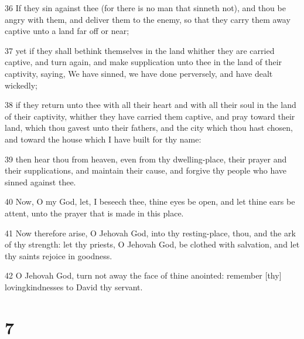 \par 36 If they sin against thee (for there is no man that sinneth not), and thou be angry with them, and deliver them to the enemy, so that they carry them away captive unto a land far off or near;
\par 37 yet if they shall bethink themselves in the land whither they are carried captive, and turn again, and make supplication unto thee in the land of their captivity, saying, We have sinned, we have done perversely, and have dealt wickedly;
\par 38 if they return unto thee with all their heart and with all their soul in the land of their captivity, whither they have carried them captive, and pray toward their land, which thou gavest unto their fathers, and the city which thou hast chosen, and toward the house which I have built for thy name:
\par 39 then hear thou from heaven, even from thy dwelling-place, their prayer and their supplications, and maintain their cause, and forgive thy people who have sinned against thee.
\par 40 Now, O my God, let, I beseech thee, thine eyes be open, and let thine ears be attent, unto the prayer that is made in this place.
\par 41 Now therefore arise, O Jehovah God, into thy resting-place, thou, and the ark of thy strength: let thy priests, O Jehovah God, be clothed with salvation, and let thy saints rejoice in goodness.
\par 42 O Jehovah God, turn not away the face of thine anointed: remember [thy] lovingkindnesses to David thy servant.

\chapter{7}

